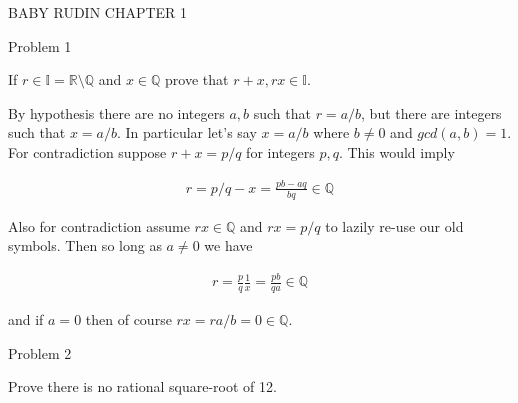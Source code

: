 \documentclass{article}
\begin{document}
	\begin{center}
		\LARGE BABY RUDIN CHAPTER 1
	\end{center}

	{\Large Problem 1

	 If $r\in\mathbb{I}=\mathbb{R}\setminus \mathbb{Q}$ and $x\in\mathbb{Q}$ prove that $r+x, rx \in\mathbb{I}$.}

	By hypothesis there are no integers $a,b$ such that $r=a/b$, but there are integers such that $x=a/b$.  In particular let's say $x=a/b$ where $b\ne 0$ and $gcd(a,b)=1$.  For contradiction suppose $r+x = p/q$ for integers $p,q$.  This would imply

	\begin{align*}
		r = p/q - x = \frac{pb-aq}{bq} \in \mathbb{Q}
	\end{align*}

	Also for contradiction assume $rx\in \mathbb{Q}$ and $rx = p/q$ to lazily re-use our old symbols.  Then so long as $a\ne 0$ we have

	\begin{align*}
		r = \frac{p}{q}\frac{1}{x} = \frac{pb}{qa} \in \mathbb{Q}
	\end{align*}

	and if $a=0$ then of course $rx = ra/b = 0\in\mathbb{Q}$.

	\pagebreak

	{\Large Problem 2

	Prove there is no rational square-root of 12.}

\end{document}
